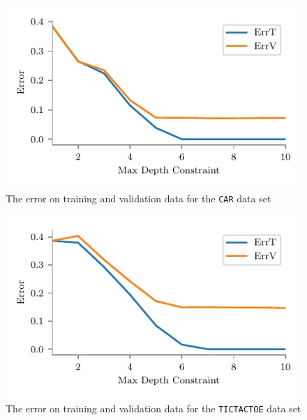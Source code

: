 \documentclass[screen, authorversion, nonacm, sigconf]{acmart}
\begin{document}
\begin{figure}[H]
  \centering
  \includegraphics[width=\columnwidth]{figures/chart_errt_errv_car_ours.pdf}
  \caption{The error on training and validation data for the \texttt{CAR} data set}
  \label{fig:carerrterrv}
\end{figure}

\begin{figure}[H]
  \centering
  \includegraphics[width=\columnwidth]{figures/chart_errt_errv_tictactoe_ours.pdf}
  \caption{The error on training and validation data for the \texttt{TICTACTOE} data set}
  \label{fig:ttterrterrv}
\end{figure}
\end{document}
